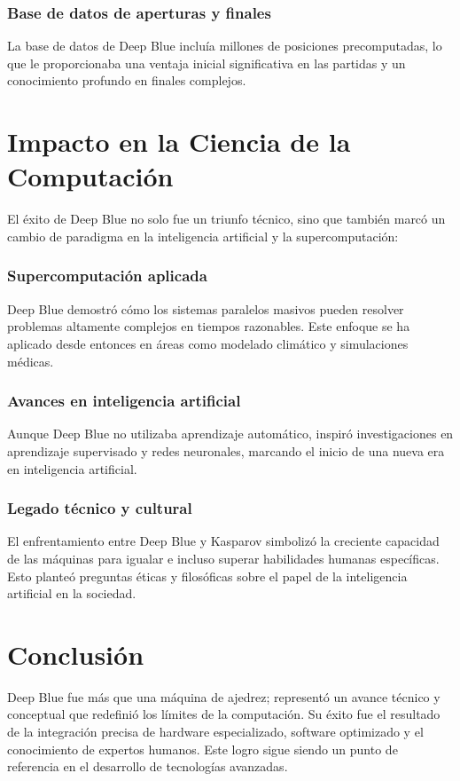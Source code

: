 \documentclass[12pt,a4paper]{article}
\begin{document}
\subsubsection*{Base de datos de aperturas y finales}
La base de datos de Deep Blue incluía millones de posiciones precomputadas, lo que le proporcionaba una ventaja inicial significativa en las partidas y un conocimiento profundo en finales complejos.

\section{Impacto en la Ciencia de la Computación}
El éxito de Deep Blue no solo fue un triunfo técnico, sino que también marcó un cambio de paradigma en la inteligencia artificial y la supercomputación:

\subsubsection*{Supercomputación aplicada}
Deep Blue demostró cómo los sistemas paralelos masivos pueden resolver problemas altamente complejos en tiempos razonables. Este enfoque se ha aplicado desde entonces en áreas como modelado climático y simulaciones médicas.

\subsubsection*{Avances en inteligencia artificial}
Aunque Deep Blue no utilizaba aprendizaje automático, inspiró investigaciones en aprendizaje supervisado y redes neuronales, marcando el inicio de una nueva era en inteligencia artificial.

\subsubsection*{Legado técnico y cultural}
El enfrentamiento entre Deep Blue y Kasparov simbolizó la creciente capacidad de las máquinas para igualar e incluso superar habilidades humanas específicas. Esto planteó preguntas éticas y filosóficas sobre el papel de la inteligencia artificial en la sociedad.

\section{Conclusión}
Deep Blue fue más que una máquina de ajedrez; representó un avance técnico y conceptual que redefinió los límites de la computación. Su éxito fue el resultado de la integración precisa de hardware especializado, software optimizado y el conocimiento de expertos humanos. Este logro sigue siendo un punto de referencia en el desarrollo de tecnologías avanzadas.

\end{document}
